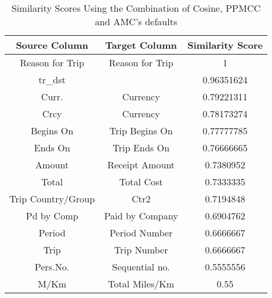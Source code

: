 \begin{table}[ht]
\centering
\begin{tabular}{|c|c|c|}
\hline
{\bf Source Column} & {\bf Target Column} & {\bf Similarity Score} \\ \hline
Reason for Trip                & Reason for Trip                & 1                                 \\ \hline
tr\_dst                        &                                & 0.96351624                        \\ \hline
Curr.                          & Currency                       & 0.79221311                        \\ \hline
Crcy                           & Currency                       & 0.78173274                        \\ \hline
Begins On                      & Trip Begins On                 & 0.77777785                        \\ \hline
Ends On                        & Trip Ends On                   & 0.76666665                        \\ \hline
Amount                         & Receipt Amount                 & 0.7380952                         \\ \hline
Total                          & Total Cost                     & 0.7333335                         \\ \hline
Trip Country/Group             & Ctr2                           & 0.7194848                         \\ \hline
Pd by Comp                     & Paid by Company                & 0.6904762                         \\ \hline
Period                         & Period Number                  & 0.6666667                         \\ \hline
Trip                           & Trip Number                    & 0.6666667                         \\ \hline
Pers.No.                       & Sequential no.                 & 0.5555556                         \\ \hline
M/Km                           & Total Miles/Km                 & 0.55                              \\ \hline
\end{tabular}
\caption{Similarity Scores Using the Combination of Cosine, PPMCC and AMC's defaults}
\label{tab:Similarity_Scores_Using_the_Combination_of_Cosine,_PPMCC_and_AMC's_defaults}
\end{table}

